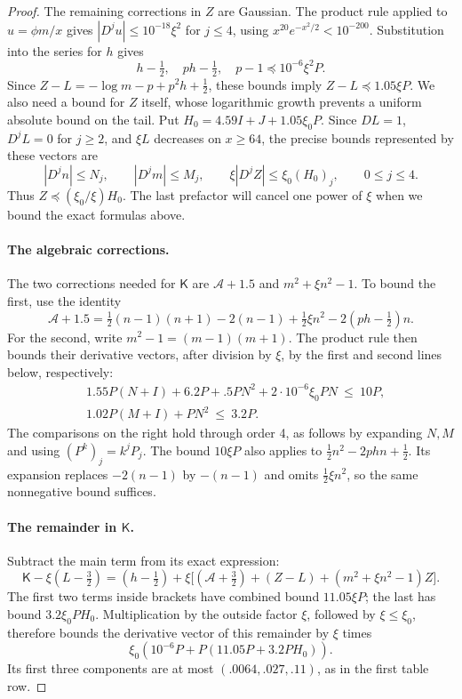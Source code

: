 \begin{proof}
The remaining corrections in \(Z\) are Gaussian. The product rule
applied to \(u=\phi m/x\) gives
\(|D^ju|\le10^{-18}\xi^2\) for \(j\le4\), using
\(x^{20}e^{-x^2/2}<10^{-200}\). Substitution into the series for \(h\)
gives
\[
 h-\tfrac12,\quad ph-\tfrac12,\quad p-1
       \preccurlyeq10^{-6}\xi^2P.
\]
Since \(Z-L=-\log m-p+p^2h+\tfrac12\), these bounds imply
\(Z-L\preccurlyeq1.05\xi P\).
We also need a bound for \(Z\) itself, whose logarithmic growth
prevents a uniform absolute bound on the tail. Put
\(H_0=4.59I+J+1.05\xi_0P\). Since
\(DL=1\), \(D^jL=0\) for \(j\ge2\), and \(\xi L\) decreases on
\(x\ge64\), the precise bounds represented by these vectors are
\[
 |D^jn|\le N_j,\qquad |D^jm|\le M_j,\qquad
 \xi|D^jZ|\le\xi_0(H_0)_j,\qquad 0\le j\le4.
\]
Thus \(Z\preccurlyeq(\xi_0/\xi)H_0\). The last prefactor will cancel
one power of \(\xi\) when we bound the exact formulas above.

\paragraph{The algebraic corrections.}
The two corrections needed for \(\mathsf K\) are
\(\mathcal A+1.5\) and \(m^2+\xi n^2-1\).
To bound the first, use the identity
\[
 \mathcal A+1.5
 =\tfrac12(n-1)(n+1)-2(n-1)+\tfrac12\xi n^2
       -2(ph-\tfrac12)n.
\]
For the second, write \(m^2-1=(m-1)(m+1)\).
The product rule then bounds their derivative vectors, after division
by \(\xi\), by the first and second lines below, respectively:
\[
\begin{aligned}
 &1.55P(N+I)+6.2P+.5P N^2+2\cdot10^{-6}\xi_0 P N \ \le\ 10P,\\
 &1.02P(M+I)+P N^2\ \le\ 3.2P .
\end{aligned}
\]
The comparisons on the right hold through order 4, as follows by
expanding \(N,M\) and using \((P^k)_j=k^jP_j\).
The bound \(10\xi P\) also applies to
\(\tfrac12n^2-2phn+\tfrac12\). Its expansion replaces
\(-2(n-1)\) by \(-(n-1)\) and omits \(\tfrac12\xi n^2\), so the
same nonnegative bound suffices.

\paragraph{The remainder in \(\mathsf K\).}
Subtract the main term from its exact expression:
\[
 \mathsf K-\xi(L-\tfrac32)
 =(h-\tfrac12)+\xi\big[
   (\mathcal A+\tfrac32)+(Z-L)+(m^2+\xi n^2-1)Z\big].
\]
The first two terms inside brackets have combined bound
\(11.05\xi P\); the last has bound \(3.2\xi_0PH_0\).
Multiplication by the outside factor \(\xi\), followed by
\(\xi\le\xi_0\), therefore bounds the derivative vector of this
remainder by \(\xi\) times
\[
 \xi_0 (10^{-6}P + P(11.05P+3.2P H_0)).
\]
Its first three components are at most \((.0064,.027,.11)\),
as in the first table row.


\end{proof}
